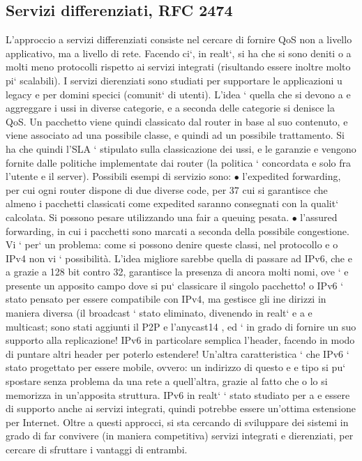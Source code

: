\documentclass[a4paper,12pt]{article}
\begin{document}
\subsection{Servizi differenziati, RFC 2474}
L'approccio a servizi differenziati consiste nel cercare di fornire QoS non a livello
applicativo, ma a livello di rete. Facendo ci`, in realt`, si ha che si sono deniti
o
a
molti meno protocolli rispetto ai servizi integrati (risultando essere inoltre molto
pi` scalabili). I servizi dierenziati sono studiati per supportare le applicazioni
u
legacy e per domini specici (comunit` di utenti). L'idea ` quella che si devono
a
e
aggreggare i ussi in diverse categorie, e a seconda delle categorie si denisce la
QoS. Un pacchetto viene quindi classicato dal router in base al suo contenuto,
e viene associato ad una possibile classe, e quindi ad un possibile trattamento.
Si ha che quindi l'SLA ` stipulato sulla classicazione dei ussi, e le garanzie
e
vengono fornite dalle politiche implementate dai router (la politica ` concordata
e
solo fra l'utente e il server).
Possibili esempi di servizio sono:
$\bullet$ l'expedited forwarding, per cui ogni router dispone di due diverse code, per
37
cui si garantisce che almeno i pacchetti classicati come expedited saranno
consegnati con la qualit` calcolata. Si possono pesare utilizzando una fair
a
queuing pesata.
$\bullet$ l'assured forwarding, in cui i pacchetti sono marcati a seconda della possibile congestione.
Vi ` per` un problema: come si possono denire queste classi, nel protocollo
e
o
IPv4 non vi ` possibilità. L'idea migliore sarebbe quella di passare ad IPv6, che
e
a
grazie a 128 bit contro 32, garantisce la presenza di ancora molti nomi, ove `
e
presente un apposito campo dove si pu` classicare il singolo pacchetto!
o
IPv6 ` stato pensato per essere compatibile con IPv4, ma gestisce gli ine
dirizzi in maniera diversa (il broadcast ` stato eliminato, divenendo in realt`
e
a
e
multicast; sono stati aggiunti il P2P e l'anycast14 , ed ` in grado di fornire un
suo supporto alla replicazione! IPv6 in particolare semplica l'header, facendo
in modo di puntare altri header per poterlo estendere! Un'altra caratteristica
` che IPv6 ` stato progettato per essere mobile, ovvero: un indirizzo di questo
e
e
tipo si pu` spostare senza problema da una rete a quell'altra, grazie al fatto che
o
lo si memorizza in un'apposita struttura. IPv6 in realt` ` stato studiato per
a e
essere di supporto anche ai servizi integrati, quindi potrebbe essere un'ottima
estensione per Internet.
Oltre a questi approcci, si sta cercando di sviluppare dei sistemi in grado
di far convivere (in maniera competitiva) servizi integrati e dierenziati, per
cercare di sfruttare i vantaggi di entrambi.
\end{document}
